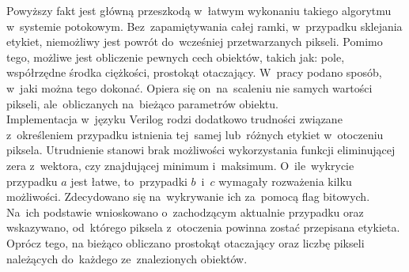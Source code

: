 Powyższy fakt jest główną przeszkodą w~łatwym wykonaniu takiego algorytmu w~systemie potokowym. 
Bez~zapamiętywania całej ramki, w~przypadku sklejania etykiet, niemożliwy jest powrót do~wcześniej przetwarzanych pikseli. 
Pomimo tego, możliwe jest obliczenie pewnych cech obiektów, takich jak: pole, współrzędne środka ciężkości, prostokąt otaczający. 
W~pracy \cite{COG} podano sposób, w~jaki można tego dokonać. 
Opiera się on~na~scaleniu nie samych wartości pikseli, ale~obliczanych na~bieżąco parametrów obiektu.\\ 
Implementacja w~języku Verilog rodzi dodatkowo trudności związane z~określeniem przypadku istnienia tej~samej lub~różnych etykiet w~otoczeniu piksela. 
Utrudnienie stanowi brak możliwości wykorzystania funkcji eliminującej zera z~wektora, czy znajdującej minimum i~maksimum. %
O~ile~wykrycie przypadku $a$ jest łatwe, to~przypadki $b$~i~$c$ wymagały rozważenia kilku możliwości. 
Zdecydowano się na~wykrywanie ich za~pomocą flag bitowych. 
Na~ich podstawie wnioskowano o~zachodzącym aktualnie przypadku oraz wskazywano, od~którego piksela z~otoczenia powinna zostać przepisana etykieta. 
Oprócz tego, na bieżąco obliczano prostokąt otaczający oraz liczbę pikseli należących do~każdego ze~znalezionych obiektów.\\

